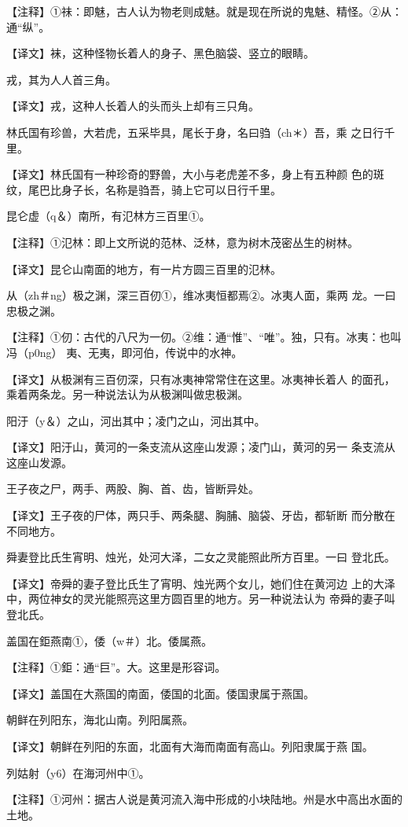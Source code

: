 \documentclass[a4paper,12pt,UTF8,twoside]{ctexbook}
\begin{document}
【注释】①祙：即魅，古人认为物老则成魅。就是现在所说的鬼魅、精怪。②从：通“纵”。

【译文】袜，这种怪物长着人的身子、黑色脑袋、竖立的眼睛。

戎，其为人人首三角。

【译文】戎，这种人长着人的头而头上却有三只角。

林氏国有珍兽，大若虎，五采毕具，尾长于身，名曰驺（ch＊）吾，乘 之日行千里。

【译文】林氏国有一种珍奇的野兽，大小与老虎差不多，身上有五种颜 色的斑纹，尾巴比身子长，名称是驺吾，骑上它可以日行千里。

昆仑虚（q＆）南所，有氾林方三百里①。

【注释】①氾林：即上文所说的范林、泛林，意为树木茂密丛生的树林。

【译文】昆仑山南面的地方，有一片方圆三百里的氾林。

从（zh＃ng）极之渊，深三百仞①，维冰夷恒都焉②。冰夷人面，乘两 龙。一曰忠极之渊。

【注释】①仞：古代的八尺为一仞。②维：通“惟”、“唯”。独，只有。冰夷：也叫冯（p0ng） 夷、无夷，即河伯，传说中的水神。

【译文】从极渊有三百仞深，只有冰夷神常常住在这里。冰夷神长着人 的面孔，乘着两条龙。另一种说法认为从极渊叫做忠极渊。

阳汙（y＆）之山，河出其中；凌门之山，河出其中。

【译文】阳汙山，黄河的一条支流从这座山发源；凌门山，黄河的另一 条支流从这座山发源。

王子夜之尸，两手、两股、胸、首、齿，皆断异处。

【译文】王子夜的尸体，两只手、两条腿、胸脯、脑袋、牙齿，都斩断 而分散在不同地方。

舜妻登比氏生宵明、烛光，处河大泽，二女之灵能照此所方百里。一曰 登北氏。

【译文】帝舜的妻子登比氏生了宵明、烛光两个女儿，她们住在黄河边 上的大泽中，两位神女的灵光能照亮这里方圆百里的地方。另一种说法认为 帝舜的妻子叫登北氏。

盖国在鉅燕南①，倭（w＃）北。倭属燕。

【注释】①鉅：通“巨”。大。这里是形容词。

【译文】盖国在大燕国的南面，倭国的北面。倭国隶属于燕国。

朝鲜在列阳东，海北山南。列阳属燕。

【译文】朝鲜在列阳的东面，北面有大海而南面有高山。列阳隶属于燕 国。

列姑射（y6）在海河州中①。

【注释】①河州：据古人说是黄河流入海中形成的小块陆地。州是水中高出水面的土地。
\end{document}
